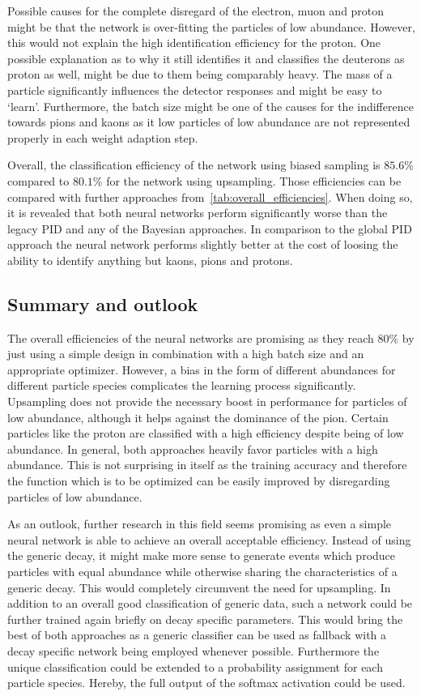 Possible causes for the complete disregard of the electron, muon and proton might be that the network is over-fitting the particles of low abundance. However, this would not explain the high identification efficiency for the proton. One possible explanation as to why it still identifies it and classifies the deuterons as proton as well, might be due to them being comparably heavy. The mass of a particle significantly influences the detector responses and might be easy to `learn'.
Furthermore, the batch size might be one of the causes for the indifference towards pions and kaons as it low particles of low abundance are not represented properly in each weight adaption step.

Overall, the classification efficiency of the network using biased sampling is $85.6 \%$ compared to $80.1 \%$ for the network using upsampling. Those efficiencies can be compared with further approaches from~\autoref{tab:overall_efficiencies}. When doing so, it is revealed that both neural networks perform significantly worse than the legacy PID and any of the Bayesian approaches. In comparison to the global PID approach the neural network performs slightly better at the cost of loosing the ability to identify anything but kaons, pions and protons.

\subsection{Summary and outlook}
\label{subsc:neural_network_summary}

The overall efficiencies of the neural networks are promising as they reach $80 \%$ by just using a simple design in combination with a high batch size and an appropriate optimizer. However, a bias in the form of different abundances for different particle species complicates the learning process significantly. Upsampling does not provide the necessary boost in performance for particles of low abundance, although it helps against the dominance of the pion. Certain particles like the proton are classified with a high efficiency despite being of low abundance. In general, both approaches heavily favor particles with a high abundance. This is not surprising in itself as the training accuracy and therefore the function which is to be optimized can be easily improved by disregarding particles of low abundance.

As an outlook, further research in this field seems promising as even a simple neural network is able to achieve an overall acceptable efficiency. Instead of using the generic decay, it might make more sense to generate events which produce particles with equal abundance while otherwise sharing the characteristics of a generic decay. This would completely circumvent the need for upsampling. In addition to an overall good classification of generic data, such a network could be further trained again briefly on decay specific parameters. This would bring the best of both approaches as a generic classifier can be used as fallback with a decay specific network being employed whenever possible. Furthermore the unique classification could be extended to a probability assignment for each particle species. Hereby, the full output of the softmax activation could be used.
